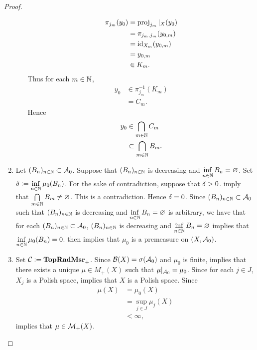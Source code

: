 \documentclass{book}
\begin{document}
\begin{proof}
\begin{enumerate}
\begin{enumerate}
\begin{align*}
				\pi_{j_m}(y_0)
				& = \operatorname{\text{proj}}_{j_m}|_{X}(y_0) \\
				& = \pi_{j_m, j_m}(y_{0,m}) \\
				& = \operatorname{id}_{X_m}(y_{0,m}) \\
				& = y_{0,m} \\
				& \in K_m.
			\end{align*}
			Thus for each $m \in \mathbb{N}$, 
			\begin{align*}
				y_0 
				& \in \pi_{j_m}^{-1}(K_m) \\
				& = C_m.
			\end{align*}
			Hence 
			\begin{align*}
				y_0
				& \in \bigcap\limits_{m \in \mathbb{N}} C_m \\
				& \subset  \bigcap\limits_{m \in \mathbb{N}} B_m.
			\end{align*}
		\end{enumerate} 
		\item Let $(B_n)_{n \in \mathbb{N}} \subset \mathcal{A}_0$. Suppose that $(B_n)_{n \in \mathbb{N}}$ is decreasing and $\inf\limits_{n \in \mathbb{N}} B_n = \varnothing$. Set $\delta \vcentcolon= \inf\limits_{n \in \mathbb{N}} \mu_0(B_n)$. For the sake of contradiction, suppose that $\delta > 0$.  imply that $\bigcap\limits_{m \in \mathbb{N}} B_m \neq \varnothing$. This is a contradiction. Hence $\delta = 0$. Since $(B_n)_{n \in \mathbb{N}} \subset \mathcal{A}_0$ such that $(B_n)_{n \in \mathbb{N}}$ is decreasing and $\inf\limits_{n \in \mathbb{N}} B_n = \varnothing$ is arbitrary, we have that for each $(B_n)_{n \in \mathbb{N}} \subset \mathcal{A}_0$, $(B_n)_{n \in \mathbb{N}}$ is decreasing and $\inf\limits_{n \in \mathbb{N}} B_n = \varnothing$ implies that $\inf\limits_{n \in \mathbb{N}} \mu_0(B_n) = 0$.  then implies that $\mu_0$ is a premeasure on $(X, \mathcal{A}_0)$. 
		\item Set $\mathcal{C} \vcentcolon= \operatorname*{\text{\textbf{TopRadMsr}}_{+}}$. Since $\mathcal{B}(X) = \sigma(\mathcal{A}_0)$ and $\mu_0$ is finite,  implies that there exists a unique $\mu \in M_+(X)$ such that $\mu|_{\mathcal{A}_0} = \mu_0$. Since for each $j \in J$, $X_j$ is a Polish space,  implies that $X$ is a Polish space. Since 
		\begin{align*}
			\mu(X)
			& = \mu_0(X) \\
			& = \sup\limits_{j \in J} \mu_j(X) \\
			& < \infty, 
		\end{align*}
		\rex{}  implies that $\mu \in \mathcal{M}_+(X)$.
		\begin{itemize}

\end{itemize}
\end{enumerate}
\end{proof}
\end{document}

